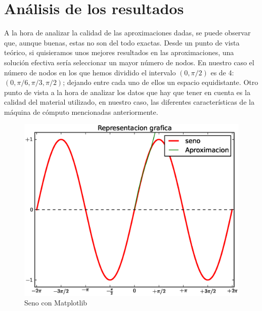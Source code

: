 \section{Análisis de los resultados}
\label{3:sec:4}
A la hora de analizar la calidad de las aproximaciones dadas, se puede observar que, aunque buenas, estas no son del todo exactas. Desde un punto de vista teórico, si quisieramos unos mejores resultados en las aproximaciones, una solución efectiva sería seleccionar un mayor número de nodos. En nuestro caso el número de nodos en los que hemos dividido el intervalo $(0, \pi/2)$ es de 4: $(0, \pi/6, \pi/3, \pi/2)$; dejando entre cada uno de ellos un espacio equidistante.
Otro punto de vista a la hora de analizar los datos que hay que tener en cuenta es la calidad del material utilizado, en nuestro caso, las diferentes características de la máquina de cómputo mencionadas anteriormente.
\begin{figure}[H]
\begin{center}
\includegraphics[scale=0.45]{images/representacionseno.eps}
\end{center}
\caption{Seno con Matplotlib}
\label{graph:4}
\end{figure}
